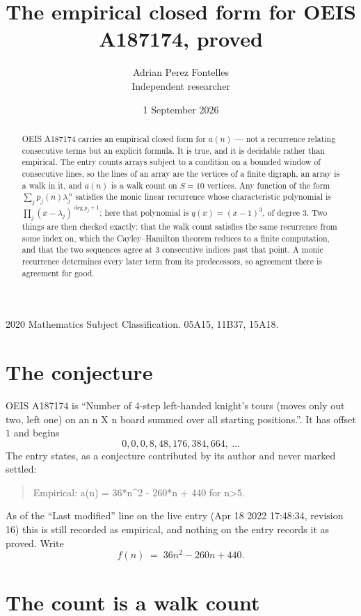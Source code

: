 \documentclass[11pt,a4paper]{article}
\title{The empirical closed form for OEIS A187174, proved}
\author{Adrian Perez Fontelles\\ \small Independent researcher}
\date{1 September 2026}
\theoremstyle{plain}
\theoremstyle{definition}
\begin{document}
\maketitle

\begin{abstract}
OEIS A187174 carries an empirical closed form for $a(n)$ --- not a recurrence relating
consecutive terms but an explicit formula. It is true, and it is decidable rather than
empirical. The entry counts arrays subject to a condition on a bounded window of consecutive lines, so the lines of an array are the
vertices of a finite digraph, an array is a walk in it, and $a(n)$ is a walk count on
$S=10$ vertices. Any function of the form $\sum_j p_j(n)\lambda_j^{\,n}$ satisfies the
monic linear recurrence whose characteristic polynomial is
$\prod_j(x-\lambda_j)^{\deg p_j+1}$; here that polynomial is $q(x)=(x-1)^{3}$, of degree
$3$. Two things are then checked exactly: that the walk count satisfies the same
recurrence from some index on, which the Cayley--Hamilton theorem reduces to a finite
computation, and that the two sequences agree at $3$ consecutive indices past that
point. A monic recurrence determines every later term from its predecessors, so agreement
there is agreement for good.
\end{abstract}

\noindent\small 2020 Mathematics Subject Classification. 05A15, 11B37, 15A18.\normalsize

\section{The conjecture}

OEIS A187174 is ``Number of 4-step left-handed knight's tours (moves only out two, left one) on an n X n board summed over all starting positions.''. It has offset $1$ and begins
\[
0, 0, 0, 8, 48, 176, 384, 664,\ \dots
\]
The entry states, as a conjecture contributed by its author and never marked settled:
\begin{quote}
Empirical: a(n) = 36*n\^{}2 - 260*n + 440 for n>5.
\end{quote}
As of the ``Last modified'' line on the live entry (Apr 18 2022 17:48:34, revision 16) this is still
recorded as empirical, and nothing on the entry records it as proved. Write
\[
f(n)\;=\;36 n^{2} - 260 n + 440.
\]

\section{The count is a walk count}
\end{document}

